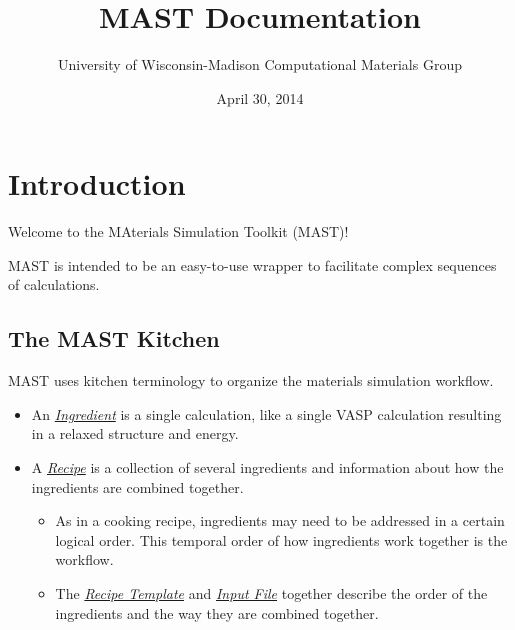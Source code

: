 \documentclass[letterpaper,10pt,english]{sphinxmanual}
\title{MAST Documentation}
\date{April 30, 2014}
\author{University of Wisconsin-Madison Computational Materials Group}
\begin{document}
\maketitle
\tableofcontents
{}\label{index::doc}



\chapter{Introduction}
\label{0_0_introduction:introduction}\label{0_0_introduction::doc}\label{0_0_introduction:materials-simulation-toolkit-mast-manual}
Welcome to the MAterials Simulation Toolkit (MAST)!

MAST is intended to be an easy-to-use wrapper to facilitate complex sequences of calculations.


\section{The MAST Kitchen}
\label{0_0_introduction:the-mast-kitchen}
MAST uses kitchen terminology to organize the materials simulation workflow.
\begin{itemize}
\item {} 
An {\hyperref[2_0_ingredients::doc]{\emph{Ingredient}}} is a single calculation, like a single VASP calculation resulting in a relaxed structure and energy.

\item {} 
A {\hyperref[4_0_recipe::doc]{\emph{Recipe}}} is a collection of several ingredients and information about how the ingredients are combined together.
\begin{itemize}
\item {} 
As in a cooking recipe, ingredients may need to be addressed in a certain logical order. This temporal order of how ingredients work together is the workflow.

\item {} 
The {\hyperref[4_0_recipe::doc]{\emph{Recipe Template}}} and {\hyperref[3_0_inputfile::doc]{\emph{Input File}}} together describe the order of the ingredients and the way they are combined together.

\end{itemize}

\end{itemize}
\end{document}
